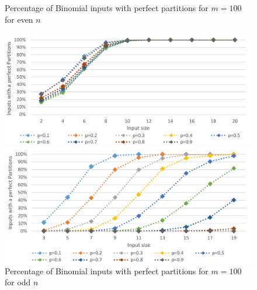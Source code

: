 \begin{figure}[h]
      \centering
      \begin{minipage}[b]{0.45\textwidth}
            \caption{Percentage of Binomial inputs with perfect partitions for $m = 100$ for even $n$}
            \includegraphics[width=\textwidth]{figures/images/solvabilityOfInputs/binomial_Input_Solvable_m100_even.png}
      \end{minipage}
      \hspace{0.75cm}
      \begin{minipage}[b]{0.45\textwidth}
            \caption{Percentage of Binomial inputs with perfect partitions for $m = 100$ for odd $n$}
            \includegraphics[width=\textwidth]{figures/images/solvabilityOfInputs/binomial_Input_Solvable_m100_uneven.png}
      \end{minipage}
\end{figure}


